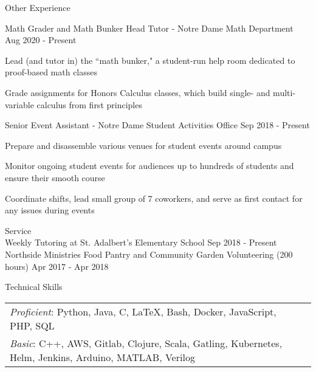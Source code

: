 \documentclass[10pt]{resume} %
\begin{document}
\begin{rSection}{Other Experience}

\begin{rSubsection}{ Math Grader and Math Bunker Head Tutor - Notre Dame Math Department }{ Aug 2020 - Present }{}{}
\item Lead (and tutor in) the ``math bunker," a student-run help room dedicated to proof-based math classes
\item Grade assignments for Honors Calculus classes, which build single- and multi-variable calculus from first principles
\end{rSubsection}


\begin{rSubsection}{ Senior Event Assistant - Notre Dame Student Activities Office }{ Sep 2018 - Present }{}{}
\item Prepare and disassemble various venues for student events around campus
\item Monitor ongoing student events for audiences up to hundreds of students and ensure their smooth course
\item Coordinate shifts, lead small group of 7 coworkers, and serve as first contact for any issues during events
\end{rSubsection}

\end{rSection}

\begin{rSection}{Service}
\\ { Weekly Tutoring at St. Adalbert's Elementary School } \hfill { Sep 2018 - Present }
\\ { Northside Ministries Food Pantry and Community Garden Volunteering (200 hours) } \hfill { Apr 2017 - Apr 2018 }
\end{rSection}


\begin{rSection}{Technical Skills}
\begin{tabular}{ @{} @{\hspace{1ex}} ll }
{\em Proficient}: Python, Java, C, LaTeX, Bash, Docker, JavaScript, PHP, SQL \\ %
{\em Basic}: C++, AWS, Gitlab, Clojure, Scala, Gatling, Kubernetes, Helm, Jenkins, Arduino, MATLAB, Verilog  \\

\end{tabular}

\end{rSection}
\end{document}

